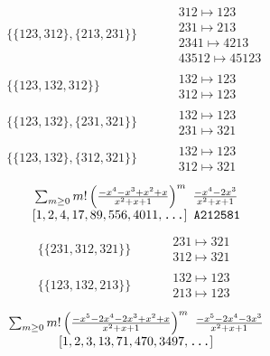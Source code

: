 \begin{tiny}
\begin{align}
\begin{matrix}
\end{matrix}
\\
\{\{123, 312\}, \{213, 231\}\}
\quad
&
\phantom{.}
&
\begin{matrix}
312 \mapsto 123\\231 \mapsto 213\\2341 \mapsto 4213\\43512 \mapsto 45123
\end{matrix}
\\
\{\{123, 132, 312\}\}
\quad
&
\phantom{.}
&
\begin{matrix}
132 \mapsto 123\\312 \mapsto 123
\end{matrix}
\\
\{\{123, 132\}, \{231, 321\}\}
\quad
&
\phantom{.}
&
\begin{matrix}
132 \mapsto 123\\231 \mapsto 321
\end{matrix}
\\
\{\{123, 132\}, \{312, 321\}\}
\quad
&
\phantom{.}
&
\begin{matrix}
132 \mapsto 123\\312 \mapsto 321
\end{matrix}
\end{align}
$$
\begin{matrix}
\sum_{m \geq 0} m! \left(
\frac{-x^{4} - x^{3} + x^{2} + x}{x^{2} + x + 1}
\right)^m
\ 
\frac{-x^{4} - 2 x^{3}}{x^{2} + x + 1}
\\
\left[1, 2, 4, 17, 89, 556, 4011, \text{\texttt{...}}\right]
\ 
\texttt{A212581}
\end{matrix}
$$
\vspace{-1em}
\begin{align}
\{\{231, 312, 321\}\}
\quad
&
\phantom{.}
&
\begin{matrix}
231 \mapsto 321\\312 \mapsto 321
\end{matrix}
\\
\{\{123, 132, 213\}\}
\quad
&
\phantom{.}
&
\begin{matrix}
132 \mapsto 123\\213 \mapsto 123
\end{matrix}
\end{align}
$$
\begin{matrix}
\sum_{m \geq 0} m! \left(
\frac{-x^{5} - 2 x^{4} - 2 x^{3} + x^{2} + x}{x^{2} + x + 1}
\right)^m
\ 
\frac{-x^{5} - 2 x^{4} - 3 x^{3}}{x^{2} + x + 1}
\\
\left[1, 2, 3, 13, 71, 470, 3497, \text{\texttt{...}}\right]

\end{matrix}$$
\end{tiny}
